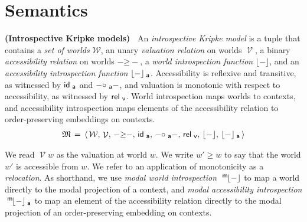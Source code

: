\documentclass{entcs}
\numberwithin{equation}{thm}
\newcommand{\binop}[1]{-\mathord{#1}-}
\newcommand{\tsf}[1]{\textsf{\upshape{#1}}}
\newcommand{\stsf}[1]{\smash{\tsf{\small{#1}}}}
\renewcommand{\:}{\mathrel{:}}
\newcommand{\0}{\varnothing}
\newcommand{\M}{\mathfrak{M}}
\newcommand{\W}{\mathcal{W}}
\newcommand{\V}{\operatorname{\mathcal{V}}}
\newcommand{\ida}{\operatorname{\tsf{id}_{\stsf{a}}}}
\newcommand{\compa}{\mathrel{\circ_{\stsf{a}}}}
\newcommand{\relv}{\operatorname{\tsf{rel}_{\stsf{v}}}}
\newcommand{\peek}[1]{\mathopen{\lfloor}{#1}\mathclose{\rfloor}}
\newcommand{\peeka}[1]{\mathopen{\lfloor}{#1}\mathclose{\rfloor_{\mkern-2mu\stsf{a}}}}
\newcommand{\mpeek}[1]{\mathopen{^{\stsf{m}\mkern-3mu}\lfloor}{#1}\mathclose{\rfloor}}
\newcommand{\mpeeka}[1]{\mathopen{^{\stsf{m}\mkern-3mu}\lfloor}{#1}\mathclose{\rfloor_{\mkern-2mu\stsf{a}}}}
\begin{document}
\lipsum[1-5]


\section{Semantics}

\begin{definition}
  \textbf{(Introspective Kripke models)\ }
  An \emph{introspective Kripke model} is a tuple that contains a \emph{set of worlds} $\W$, an unary \emph{valuation relation} on worlds $\V$, a binary \emph{accessibility relation} on worlds $\binop{\ge}$, a \emph{world introspection function} $\peek{-}$, and an \emph{accessibility introspection function} $\peeka{-}$.
  Accessibility is reflexive and transitive, as witnessed by $\ida$ and $\binop{\compa}$, and valuation is monotonic with respect to accessibility, as witnessed by $\relv$.
  World introspection maps worlds to contexts, and accessibility introspection maps elements of the accessibility relation to order-preserving embeddings on contexts.
  \begin{gather*}
    \M \,=\, \langle\, \W,\, \V,\, \binop{\ge},\, \ida,\, \binop{\compa},\, \relv,\, \peek{-},\, \peeka{-}\, \rangle
  \end{gather*}
\end{definition}

\noindent
We read $\V w$ as the valuation at world $w$.
We write $w' \ge w$ to say that the world $w'$ is accessible from $w$.
We refer to an application of monotonicity as a \emph{relocation}.
As shorthand, we use \emph{modal world introspection} $\mpeek{-}$ to map a world directly to the modal projection of a context, and \emph{modal accessibility introspection} $\mpeeka{-}$ to map an element of the accessibility relation directly to the modal projection of an order-preserving embedding on contexts.
\end{document}
